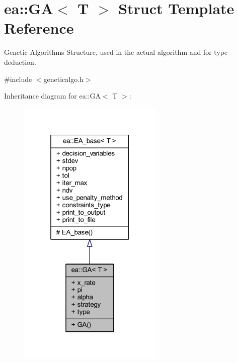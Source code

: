 \hypertarget{structea_1_1_g_a}{}\section{ea\+:\+:GA$<$ T $>$ Struct Template Reference}
\label{structea_1_1_g_a}


Genetic Algorithms Structure, used in the actual algorithm and for type deduction.  




{\ttfamily \#include $<$geneticalgo.\+h$>$}



Inheritance diagram for ea\+:\+:GA$<$ T $>$\+:
\nopagebreak
\begin{figure}[H]
\begin{center}
\leavevmode
\includegraphics[width=196pt]{structea_1_1_g_a__inherit__graph}
\end{center}
\end{figure}
